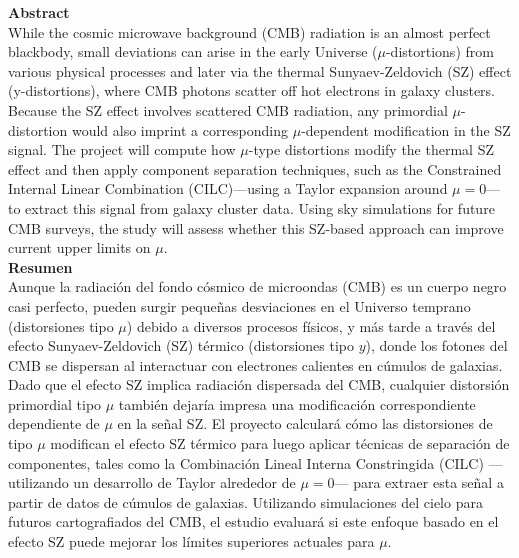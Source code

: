 \documentclass[11pt, a4paper, oneside]{book}
\numberwithin{equation}{section}
\begin{document}
\thispagestyle{footer}
\newpage
\thispagestyle{empty}
\mbox{}
\newpage
\selectfont
    \noindent\Large{\sffamily\textbf{Abstract}}\\[-1.25em]

    
    \normalsize{While the cosmic microwave background (CMB) radiation is an almost perfect blackbody,
    small deviations can arise in the early Universe ($\mu$-distortions) from various physical processes and later via the thermal Sunyaev-Zeldovich (SZ) effect (y-distortions),
    where CMB photons scatter off hot electrons in galaxy clusters.
    Because the SZ effect involves scattered CMB radiation, any primordial $\mu$-distortion would also imprint a corresponding $\mu$-dependent modification in the SZ signal.
    The project will compute how $\mu$-type distortions modify the thermal SZ effect and then apply component separation techniques,
    such as the Constrained Internal Linear Combination (CILC)—using a Taylor expansion around $\mu = 0$—to extract this signal from galaxy cluster data.
    Using sky simulations for future CMB surveys, the study will assess whether this SZ-based approach can improve current upper limits on $\mu$.}\\

    
    
    \noindent\Large{\sffamily\textbf{Resumen}}\\[-1.25em]

    
    \normalsize{Aunque la radiación del fondo cósmico de microondas (CMB) es un cuerpo negro casi perfecto,
    pueden surgir pequeñas desviaciones en el Universo temprano (distorsiones tipo $\mu$) debido a diversos procesos físicos, y más tarde a través del efecto Sunyaev-Zeldovich (SZ) térmico (distorsiones tipo $y$),
    donde los fotones del CMB se dispersan al interactuar con electrones calientes en cúmulos de galaxias.
    Dado que el efecto SZ implica radiación dispersada del CMB, cualquier distorsión primordial tipo $\mu$ también dejaría impresa una modificación correspondiente dependiente de $\mu$ en la señal SZ.
    El proyecto calculará cómo las distorsiones de tipo $\mu$ modifican el efecto SZ térmico para luego aplicar técnicas de separación de componentes,
    tales como la Combinación Lineal Interna Constringida (CILC) ---utilizando un desarrollo de Taylor alrededor de $\mu = 0$--- para extraer esta señal a partir de datos de cúmulos de galaxias.
    Utilizando simulaciones del cielo para futuros cartografiados del CMB, el estudio evaluará si este enfoque basado en el efecto SZ puede mejorar los límites superiores actuales para $\mu$.} \\[-0.25em]
    
\end{document}
